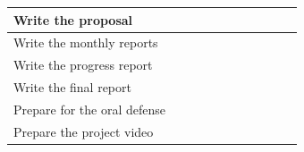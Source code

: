 \begin{center}
\begin{tabularx}{\textwidth}{|X|c|c|c|c|c|c|c|c|c|c|}
        \hline
        Write the proposal & & & \cellcolor{lightgray} & & & & & & & \\
        \hline
        Write the monthly reports & & & & \cellcolor{lightgray} & \cellcolor{lightgray} & \cellcolor{lightgray} & \cellcolor{lightgray} & & & \\
        \hline
        Write the progress report & & & & & & & \cellcolor{lightgray} & \cellcolor{lightgray} & & \\
        \hline
        Write the final report & & & & & & & & & \cellcolor{lightgray} & \cellcolor{lightgray} \\
        \hline
        Prepare for the oral defense  & & & & & & & & & \cellcolor{lightgray} & \cellcolor{lightgray} \\
        \hline
        Prepare the project video & & & & & & & & & \cellcolor{lightgray} & \cellcolor{lightgray} \\
        \hline
    \end{tabularx}
\end{center}